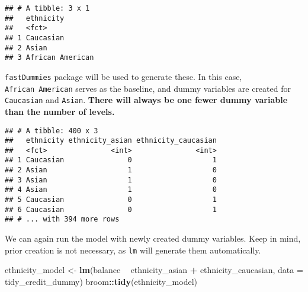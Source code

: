 \documentclass[]{book}
\newenvironment{Shaded}{\begin{snugshade}}{\end{snugshade}}
\newcommand{\DataTypeTok}[1]{\textcolor[rgb]{0.13,0.29,0.53}{#1}}
\newcommand{\KeywordTok}[1]{\textcolor[rgb]{0.13,0.29,0.53}{\textbf{#1}}}
\newcommand{\NormalTok}[1]{#1}
\newcommand{\OperatorTok}[1]{\textcolor[rgb]{0.81,0.36,0.00}{\textbf{#1}}}
\newcommand{\OtherTok}[1]{\textcolor[rgb]{0.56,0.35,0.01}{#1}}
\newcommand{\StringTok}[1]{\textcolor[rgb]{0.31,0.60,0.02}{#1}}
\begin{document}
\begin{verbatim}
## # A tibble: 3 x 1
##   ethnicity       
##   <fct>           
## 1 Caucasian       
## 2 Asian           
## 3 African American
\end{verbatim}

\texttt{fastDummies} package will be used to generate these. In this case, \texttt{African\ American} serves as the baseline, and dummy variables are created for \texttt{Caucasian} and \texttt{Asian}. \textbf{There will always be one fewer dummy variable than the number of levels.}

\begin{Shaded}
\end{Shaded}

\begin{verbatim}
## # A tibble: 400 x 3
##   ethnicity ethnicity_asian ethnicity_caucasian
##   <fct>               <int>               <int>
## 1 Caucasian               0                   1
## 2 Asian                   1                   0
## 3 Asian                   1                   0
## 4 Asian                   1                   0
## 5 Caucasian               0                   1
## 6 Caucasian               0                   1
## # ... with 394 more rows
\end{verbatim}

We can again run the model with newly created dummy variables. Keep in mind, prior creation is not necessary, as \texttt{lm} will generate them automatically.

\begin{Shaded}
\begin{Highlighting}[]
\NormalTok{ethnicity_model <-}\StringTok{ }\KeywordTok{lm}\NormalTok{(balance }\OperatorTok{~}\StringTok{ }\NormalTok{ethnicity_asian }\OperatorTok{+}\StringTok{ }\NormalTok{ethnicity_caucasian, }\DataTypeTok{data =}\NormalTok{ tidy_credit_dummy)}
\NormalTok{broom}\OperatorTok{::}\KeywordTok{tidy}\NormalTok{(ethnicity_model)}
\end{Highlighting}
\end{Shaded}
\end{document}
